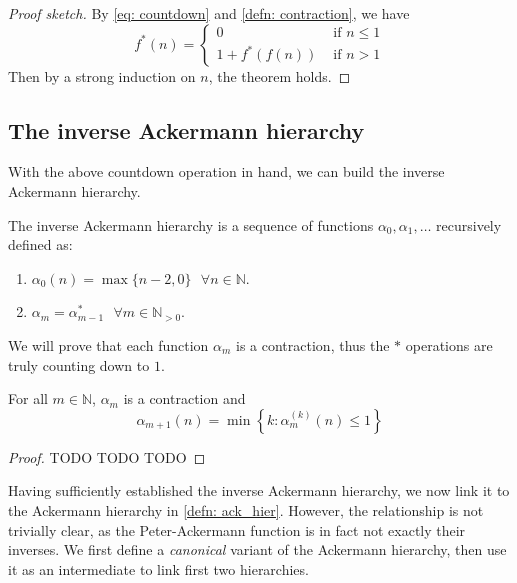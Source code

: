 \begin{proof}[Proof sketch]
By \eqref{eq: countdown} and \cref{defn: contraction}, we have
\begin{equation*}
f^*(n) = \begin{cases}
0 & \text{ if } n \le 1 \\ 1 + f^*(f(n)) & \text{ if } n > 1
\end{cases}
\end{equation*}
Then by a strong induction on $n$, the theorem holds.
\end{proof}
\fi

\iffalse 
\subsection{The inverse Ackermann hierarchy}

With the above countdown operation in hand, we can 
build the inverse Ackermann hierarchy.

\begin{defn} \label{defn: inv_ack_hier}
The inverse Ackermann hierarchy is a sequence of 
functions $\alpha_0, \alpha_1, \ldots $ recursively defined as:
\begin{enumerate}
	\item $\alpha_0(n) = \max\{n-2, 0\} \ \ \ \forall n \in \mathbb{N}$.
	\item $\alpha_m = \alpha_{m-1}^*  \ \ \ \forall m\in \mathbb{N}_{>0}$.
\end{enumerate}
\end{defn}

We will prove that each function $\alpha_m$ is a contraction, 
thus the $*$ operations are truly counting down to $1$.

\begin{thm} \label{thm: inv_ack_countdown}
For all $m\in\mathbb{N}$, $\alpha_m$ is a contraction and
\begin{equation}
\alpha_{m+1}(n) = \min\left\{ k : \alpha_m^{(k)}(n) \le 1 \right\}
\end{equation}
\end{thm}

\begin{proof}
TODO TODO TODO
\end{proof}

Having sufficiently established the inverse Ackermann 
hierarchy, we now link it to the Ackermann hierarchy 
in \cref{defn: ack_hier}. However, the relationship is 
not trivially clear, as the Peter-Ackermann function is 
in fact not exactly {\color{magenta}their inverses.} 
We first define a \textit{canonical} variant of the 
Ackermann hierarchy, then use it as an intermediate to 
link first two hierarchies.


